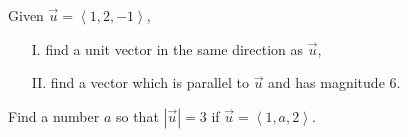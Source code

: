 \documentclass[]{ximera}
\begin{document}
\begin{problem}
Given $\vec{u} = \left<1,2,-1\right>$,
\begin{itemize}
\item[I.] find a unit vector in the same direction as $\vec{u}$,
\item[II.] find a vector which is parallel to $\vec{u}$ and has magnitude $6$.
\end{itemize}
\begin{solution}
\end{solution}
\end{problem}

\begin{problem}
Find a number $a$ so that $\left|\vec{u}\right| = 3$ if $\vec{u} = \left<1,a,2\right>$. 

\begin{solution}

\end{solution}
\end{problem}
\end{document}
